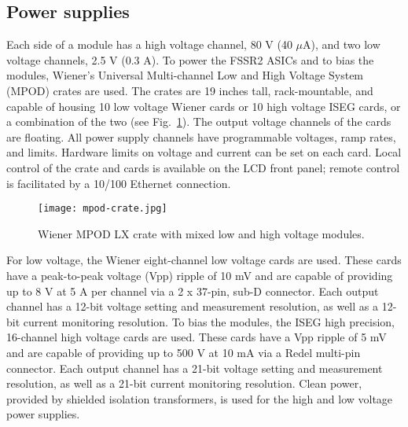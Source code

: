 \subsection{Power supplies}

Each side of a module has a high voltage channel, 80 V (40 $\mu$A), and two low voltage channels, 2.5 V (0.3 A). To power the FSSR2 ASICs and to bias the modules, Wiener's Universal Multi-channel Low and High Voltage System (MPOD) crates are used. The crates are 19 inches tall, rack-mountable, and capable of housing 10 low voltage Wiener cards or 10 high voltage ISEG cards, or a combination of the two (see Fig.~\ref{fig:mpod-crate}). The output voltage channels of the cards are floating. All power supply channels have programmable voltages, ramp rates, and limits. Hardware limits on voltage and current can be set on each card. Local control of the crate and cards is available on the LCD front panel; remote control is facilitated by a 10/100 Ethernet connection. 

\begin{figure}[hbt] 
\centering 
\texttt{[image: mpod-crate.jpg]}
\caption{Wiener MPOD LX crate with mixed low and high voltage modules.}
\label{fig:mpod-crate}
\end{figure}

For low voltage, the Wiener eight-channel low voltage cards are used. These cards have a peak-to-peak voltage (Vpp) ripple of 10 mV and are capable of providing up to 8 V at 5 A per channel via a 2 x 37-pin, sub-D connector. Each output channel has a 12-bit voltage setting and measurement resolution, as well as a 12-bit current monitoring resolution. To bias the modules, the ISEG high precision, 16-channel high voltage cards are used. These cards have a Vpp ripple of 5 mV and are capable of providing up to 500 V at 10 mA via a Redel multi-pin connector. Each output channel has a 21-bit voltage setting and measurement resolution, as well as a 21-bit current monitoring resolution. Clean power, provided by shielded isolation transformers, is used for the high and low voltage power supplies.

